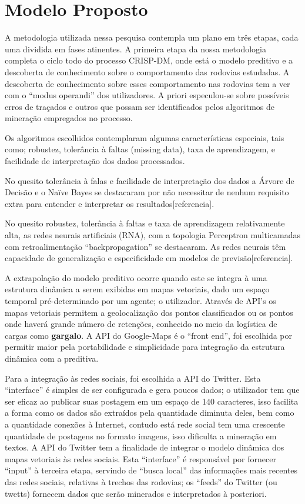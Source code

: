 \section{Modelo Proposto}

A metodologia utilizada nessa pesquisa contempla um plano em três etapas, cada uma dividida em fases atinentes.
A primeira etapa da nossa metodologia completa o ciclo todo do processo CRISP-DM, onde está o modelo preditivo e 
a descoberta de conhecimento sobre o comportamento das rodovias estudadas. A descoberta de conhecimento sobre esses comportamento 
nas rodovias tem a ver com o ``modus operandi'' dos utilizadores. A priori especulou-se sobre possíveis erros de traçados e outros que possam
ser identificados pelos algoritmos de mineração empregados no processo.

Os algoritmos escolhidos contemplaram algumas características especiais, tais como; robustez, tolerância à faltas (missing data),
taxa de aprendizagem, e facilidade de interpretação dos dados processados. 

No quesito tolerância à falas e facilidade de interpretação dos dados a Árvore de Decisão e o Naïve Bayes se destacaram por não necessitar
de nenhum requisito extra para entender e interpretar os resultados[referencia].

No quesito robustez, tolerância à faltas e taxa de aprendizagem relativamente alta, as redes neurais artificiais (RNA), com a 
topologia Perceptron multicamadas com retroalimentação ``backpropagation'' se destacaram. 
As redes neurais têm capacidade de generalização e especificidade em modelos de previsão[referencia]. 

A extrapolação do modelo preditivo ocorre quando este se integra à uma estrutura dinâmica a serem exibidas em mapas vetoriais, 
dado um espaço temporal pré-determinado por um agente; o utilizador. 
Através de API's os mapas vetoriais permitem a geolocalização dos pontos classificados ou os pontos onde haverá grande número de 
retenções, conhecido no meio da logística de cargas como \textbf{gargalo}.
A API do Google-Maps é o ``front end'', foi escolhida por permitir maior pela portabilidade e simplicidade para integração da estrutura
dinâmica com a preditiva.

Para a integração às redes sociais, foi escolhida a API do Twitter. Esta ``interface'' é simples de ser configurada e gera poucos dados; 
o utilizador tem que ser eficaz ao publicar suas postagem em um espaço de 140 caracteres, isso facilita a forma como os dados são
extraídos pela quantidade diminuta deles, bem como a quantidade conexões à Internet, contudo está rede social tem uma crescente quantidade
de postagens no formato imagens, isso dificulta a mineração em textos.
A API do Twitter tem a finalidade de integrar o modelo dinâmica dos mapas vetoriais às redes sociais. 
Esta ``interface'' é responsável por fornecer ``input'' à terceira etapa, servindo de ``busca local'' das informações mais recentes das 
redes sociais, relativas à trechos das rodovias; os ``feeds'' do Twitter (ou twetts) fornecem dados que serão minerados e interpretados à posteriori.

